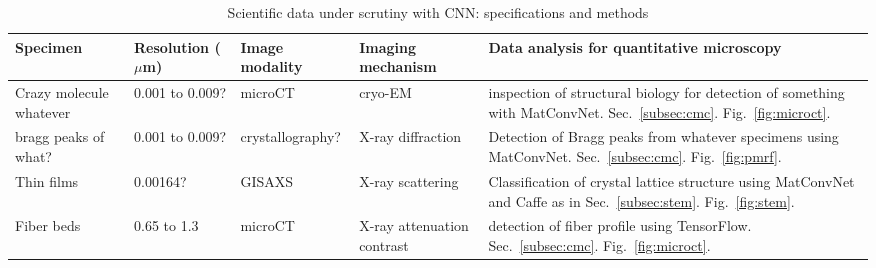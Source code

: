 
\begin{table*}[!]
\centering
\caption{Scientific data under scrutiny with CNN: specifications and methods}
\label{table1}
\begin{tabular}{p{2cm}p{1.6cm}p{1.6cm}p{3cm}p{7.5cm}}
\hline
\rowcolor[HTML]{CCE5FF}
Specimen  &  Resolution ($\mu$m)  &  Image \newline modality  &  Imaging  \newline mechanism  &  Data analysis for quantitative microscopy
\\
\hline
\rowcolor[HTML]{FFFFFF} %
Crazy molecule \newline whatever & 0.001 to 0.009? & microCT & cryo-EM & inspection of structural biology for detection of something with MatConvNet. Sec.~\ref{subsec:cmc}. Fig.~\ref{fig:microct}.
\\
\hline
\rowcolor[HTML]{F6F6F6} %
bragg peaks of what? & 0.001 to 0.009?  & crystallography? & X-ray diffraction  & Detection of Bragg peaks from whatever specimens using MatConvNet. Sec.~\ref{subsec:cmc}. Fig.~\ref{fig:pmrf}.
\\
\hline
\rowcolor[HTML]{FFFFFF} %
Thin films   & 0.00164?  & GISAXS  & X-ray scattering & Classification of crystal lattice structure using MatConvNet and Caffe as in Sec.~\ref{subsec:stem}. Fig.~\ref{fig:stem}.
\\
\hline
\rowcolor[HTML]{F6F6F6} %
Fiber beds & 0.65 to 1.3 & microCT  & X-ray attenuation contrast & detection of fiber profile using TensorFlow. Sec.~\ref{subsec:cmc}. Fig.~\ref{fig:microct}.
\\
\hline
\end{tabular}
\end{table*}
